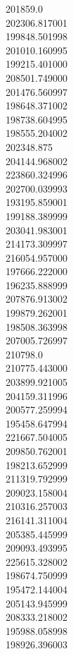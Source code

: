 201859.0\\
202306.817001\\
199848.501998\\
201010.160995\\
199215.401000\\
208501.749000\\
201476.560997\\
198648.371002\\
198738.604995\\
198555.204002\\
202348.875\\
204144.968002\\
223860.324996\\
202700.039993\\
193195.859001\\
199188.389999\\
203041.983001\\
214173.309997\\
216054.957000\\
197666.222000\\
196235.888999\\
207876.913002\\
199879.262001\\
198508.363998\\
207005.726997\\
210798.0\\
210775.443000\\
203899.921005\\
204159.311996\\
200577.259994\\
195458.647994\\
221667.504005\\
209850.762001\\
198213.652999\\
211319.792999\\
209023.158004\\
210316.257003\\
216141.311004\\
205385.445999\\
209093.493995\\
225615.328002\\
198674.750999\\
195472.144004\\
205143.945999\\
208333.218002\\
195988.058998\\
198926.396003\\
